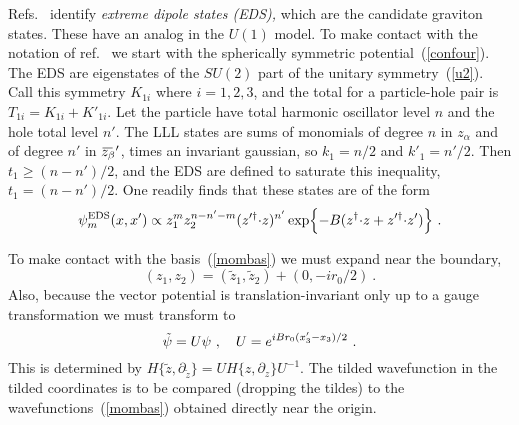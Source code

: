 \documentclass[a4paper,12pt]{article}
\newcommand{\OL}[1]{ \hspace{1pt}\overline{\hspace{-1pt}#1
   \hspace{-2pt}}\hspace{2pt} }
\begin{document}
Refs.~\cite{hz1,hz2} identify {\it extreme dipole states (EDS),} which are
the candidate graviton states.  These have an analog in the $U(1)$ model. 
To make contact with the notation of ref.~\cite{hz2} we start with the
spherically symmetric potential~(\ref{confour}).  The EDS are
eigenstates of the
$SU(2)$ part of the unitary symmetry~(\ref{u2}).  Call this symmetry
$K_{1i}$ where $i = 1,2,3$, and the total for a particle-hole pair is $T_{1i}
= K_{1i} + K'_{1i}$.  Let the particle have total harmonic oscillator level
$n$ and the hole total level
$n'$.  The LLL states are sums of monomials of degree $n$ in $z_\alpha$ and of
degree $n'$ in $\OL{z_\beta}'$, times an invariant gaussian, so $k_1 = n/2$ and
$k'_1 = n'/2$.  Then $t_1 \geq (n-n')/2$, and the EDS are defined to saturate
this inequality, $t_1 = (n-n')/2$.  One readily finds that these states are
of the form
\begin{equation}
\psi^{\rm EDS}_m(x,x') \propto z_1^m z_2^{n - n' - m} (z'^\dagger{\cdot}
z)^{n'}
\exp\Bigl\{ -B( z^\dagger{\cdot} z + z'^\dagger{\cdot} z'
)\Bigr\}\ .
\label{eds}
\end{equation}

To make contact with the basis~(\ref{mombas}) we must expand near the boundary,
\begin{equation}
(z_1, z_2) = (\tilde z_1, \tilde z_2) + (0,-ir_0/2)\ .
\end{equation}
Also, because the
vector potential is translation-invariant only up to a gauge
transformation we must transform to
\begin{equation}
\tilde\psi = U \psi\ ,\quad U = e^{i B r_0 (x'_3 - x\vphantom{'}_3)/2} \
.
\end{equation}
This is determined by $H\{\tilde z, \partial_{\tilde z} \} = U H\{ z,
\partial_z\} U^{-1}$.  
The tilded wavefunction in the tilded coordinates is to be compared
(dropping the tildes) to the wavefunctions~(\ref{mombas}) obtained directly
near the origin.  
\end{document}

